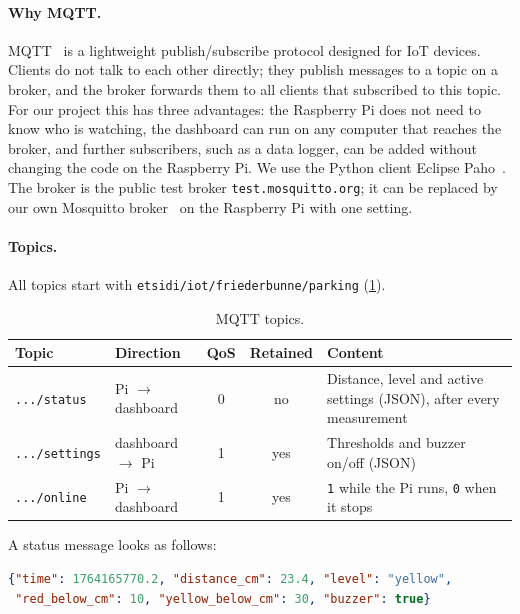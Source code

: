 \documentclass[11pt,a4paper]{article}
\begin{document}
\paragraph{Why MQTT.} MQTT~\cite{mqtt311} is a lightweight publish/subscribe
protocol designed for IoT devices. Clients do not talk to each other directly;
they publish messages to a topic on a broker, and the broker forwards them to all
clients that subscribed to this topic. For our project this has three
advantages: the Raspberry Pi does not need to know who is watching, the
dashboard can run on any computer that reaches the broker, and further
subscribers, such as a data logger, can be added without changing the code on
the Raspberry Pi. We use the Python client Eclipse Paho~\cite{paho}. The broker
is the public test broker \texttt{test.mosquitto.org}; it can be replaced by our
own Mosquitto broker~\cite{mosquitto} on the Raspberry Pi with one setting.

\paragraph{Topics.} All topics start with
\texttt{etsidi/iot/friederbunne/parking} (\cref{tab:topics}).

\begin{table}[htbp]
  \centering
  \caption{MQTT topics.}
  \label{tab:topics}
  \begin{tabularx}{\textwidth}{@{}l l c c X@{}}
    \toprule
    Topic & Direction & QoS & Retained & Content \\
    \midrule
    \texttt{.../status}   & Pi $\to$ dashboard & 0 & no  & Distance, level and active settings (JSON), after every measurement \\
    \texttt{.../settings} & dashboard $\to$ Pi & 1 & yes & Thresholds and buzzer on/off (JSON) \\
    \texttt{.../online}   & Pi $\to$ dashboard & 1 & yes & \texttt{1} while the Pi runs, \texttt{0} when it stops \\
    \bottomrule
  \end{tabularx}
\end{table}

A status message looks as follows:
\begin{lstlisting}[language=json,numbers=none,caption={Example of a status message.},label={lst:status}]
{"time": 1764165770.2, "distance_cm": 23.4, "level": "yellow",
 "red_below_cm": 10, "yellow_below_cm": 30, "buzzer": true}
\end{lstlisting}
\end{document}
